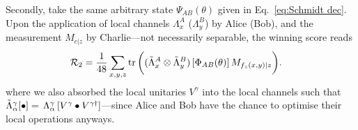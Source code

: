 \documentclass[aps,superscriptaddress,twocolumn,twoside,floatfix,pra,nofootinbib,a4paper]{revtex4-2}
\newcommand{\ketbra}[2]{\vert #1\rangle\langle#2 \vert}
\newcommand{\armin}[1]{\textit{\small\textcolor{red}{Armin: #1}}}
\newcommand{\moha}[1]{\textit{\small\textcolor{cyan}{moha: #1}}}
\begin{document}
   Secondly, take the same  arbitrary state $\Psi_{AB}(\theta)$ given in Eq.~\eqref{eq:Schmidt dec}. 
   Upon the application of local channels $\Lambda_{x}^{A}$ ($\Lambda_{y}^{B}$) by Alice (Bob), and the measurement $M_{c|z}$ by Charlie---not necessarily separable, the winning score reads %
\begin{align}
 \mathcal{R}_2 & = \frac{1}{48}\sum_{x,y,z}\tr\bigg((\tilde{\Lambda}^A_{x} \otimes \tilde{\Lambda}^B_{y})\, [\Phi_{AB}(\theta)] \, M_{f_z(x,y)|z}\bigg).
\end{align}
where we also absorbed the local unitaries $V^{\gamma}$ into the local channels such that $\Tilde{\Lambda}^{\gamma}_{\alpha} [\bullet] = \, \Lambda_{\alpha}^\gamma \, [V^\gamma \bullet V^{\gamma{\dagger}}]$---since Alice and Bob have the chance to optimise their local operations anyways.  %
\end{document}
